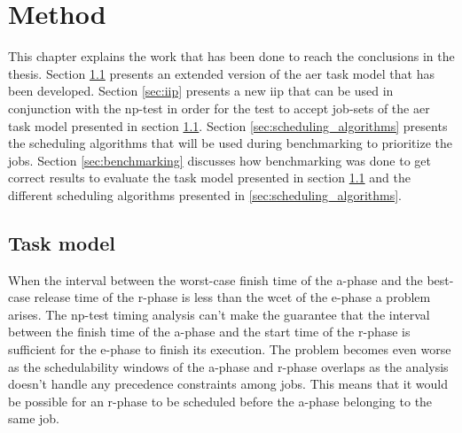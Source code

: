 \documentclass{kththesis}
\begin{document}
\chapter{Method} \label{ch:method}

This chapter explains the work that has been done to reach the conclusions in the thesis. Section
\ref{sec:work_task_model} presents an extended version of the \acrshort{aer} task model that has
been developed. Section \ref{sec:iip} presents a new \acrshort{iip} that can be used in conjunction
with the \acrshort{np}-test in order for the test to accept job-sets of the \acrshort{aer} task
model presented in section \ref{sec:work_task_model}. Section \ref{sec:scheduling_algorithms}
presents the scheduling algorithms that will be used during benchmarking to prioritize the jobs.
Section \ref{sec:benchmarking} discusses how benchmarking was done to get correct results to
evaluate the task model presented in section \ref{sec:work_task_model} and the different scheduling
algorithms presented in \ref{sec:scheduling_algorithms}.

\section{Task model} \label{sec:work_task_model}

When the interval between the worst-case finish time of the \acrshort{a}-phase and the best-case
release time of the \acrshort{r}-phase is less than the \acrshort{wcet} of the \acrshort{e}-phase a
problem arises. The \acrshort{np}-test timing analysis can't make the guarantee that the interval
between the finish time of the \acrshort{a}-phase and the start time of the \acrshort{r}-phase is
sufficient for the \acrshort{e}-phase to finish its execution. The problem becomes even worse as the
schedulability windows of the \acrshort{a}-phase and \acrshort{r}-phase overlaps as the analysis
doesn't handle any precedence constraints among jobs. This means that it would be possible for an
\acrshort{r}-phase to be scheduled before the \acrshort{a}-phase belonging to the same job.
\end{document}
